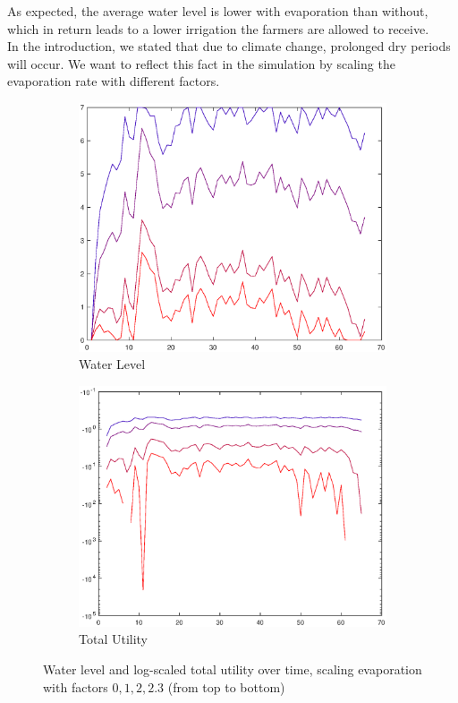 \documentclass[12pt, a4paper, oneside]{article}
\begin{document}
As expected, the average water level is lower with evaporation than without, which in return leads to a lower irrigation the farmers are allowed to receive. \\
In the introduction, we stated that due to climate change, prolonged dry periods will occur. We want to reflect this fact in the simulation by scaling the evaporation rate with different factors. 

\begin{figure}[ht]
\begin{subfigure}{0.5\textwidth}
	\centering
	\includegraphics[width=1\textwidth]{figures/results-evap-factors-water-levels.eps}
	\caption{Water Level}
	\label{fig:water-level-evap}
\end{subfigure}%
\begin{subfigure}{.5\textwidth}
	\centering
	\includegraphics[width=1\textwidth]{figures/results-evap-factors-utilities.eps}
	\caption{Total Utility}
	\label{fig:total-utility-evap}
\end{subfigure}
\caption{Water level and log-scaled total utility over time, scaling evaporation with factors $0, 1, 2, 2.3$ (from top to bottom)}
\label{fig:evaporation-factors}
\end{figure}
\end{document}
